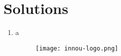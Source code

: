 \documentclass{article}
\begin{document}

\section*{Solutions}
\begin{enumerate}
    \item a %
    \begin{figure}[t]
        \centering
        \texttt{[image: innou-logo.png]} %
    \end{figure}
\end{enumerate}
\end{document}
